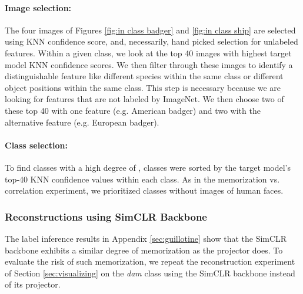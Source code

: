 \paragraph{Image selection:} The four images of Figures \ref{fig:in class badger} 
 and \ref{fig:in class ship} 
are selected using KNN confidence score, and, necessarily, hand picked selection for unlabeled features. Within a given class, we look at the top 40 images with highest target model KNN confidence scores. We then filter through these images to identify a distinguishable feature like different species within the same class or different object positions within the same class. This step is necessary because we are looking for features that are not labeled by ImageNet. We then choose two of these top 40 with one feature (e.g. American badger) and two with the alternative feature (e.g. European badger). 

\paragraph{Class selection:} To find classes with a high degree of \dejavu, classes were sorted by the target model's top-40 KNN confidence values within each class. As in the memorization vs. correlation experiment, we prioritized classes without images of human faces.

\subsubsection{Reconstructions using SimCLR Backbone} 
\label{sec:appx backbone results} 
The label inference results in Appendix \ref{sec:guillotine} show that the SimCLR backbone exhibits a similar degree of \dejavu memorization as the projector does. To evaluate the risk of such memorization, we repeat the reconstruction experiment of Section \ref{sec:visualizing} on the \emph{dam} class using the SimCLR backbone instead of its projector.\\

